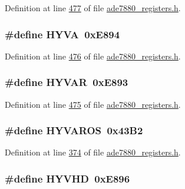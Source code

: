 Definition at line \hyperlink{a00036_source_l00477}{477} of file \hyperlink{a00036_source}{ade7880\-\_\-registers.\-h}.

\hypertarget{a00036_a8a225ce68dcc59466a3b22d1b788f311}{
\subsubsection[{H\-Y\-V\-A}]{\setlength{\rightskip}{0pt plus 5cm}\#define H\-Y\-V\-A~0x\-E894}}\label{de/d8c/a00036_a8a225ce68dcc59466a3b22d1b788f311}


Definition at line \hyperlink{a00036_source_l00476}{476} of file \hyperlink{a00036_source}{ade7880\-\_\-registers.\-h}.

\hypertarget{a00036_a847595b2ffa3361f8ae0d4613fbf7e37}{
\subsubsection[{H\-Y\-V\-A\-R}]{\setlength{\rightskip}{0pt plus 5cm}\#define H\-Y\-V\-A\-R~0x\-E893}}\label{de/d8c/a00036_a847595b2ffa3361f8ae0d4613fbf7e37}


Definition at line \hyperlink{a00036_source_l00475}{475} of file \hyperlink{a00036_source}{ade7880\-\_\-registers.\-h}.

\hypertarget{a00036_ad951210faadd462b49a760597c96ddcf}{
\subsubsection[{H\-Y\-V\-A\-R\-O\-S}]{\setlength{\rightskip}{0pt plus 5cm}\#define H\-Y\-V\-A\-R\-O\-S~0x43\-B2}}\label{de/d8c/a00036_ad951210faadd462b49a760597c96ddcf}


Definition at line \hyperlink{a00036_source_l00374}{374} of file \hyperlink{a00036_source}{ade7880\-\_\-registers.\-h}.

\hypertarget{a00036_a2f6ec1439fe130170ec30efb36850100}{
\subsubsection[{H\-Y\-V\-H\-D}]{\setlength{\rightskip}{0pt plus 5cm}\#define H\-Y\-V\-H\-D~0x\-E896}}\label{de/d8c/a00036_a2f6ec1439fe130170ec30efb36850100}


